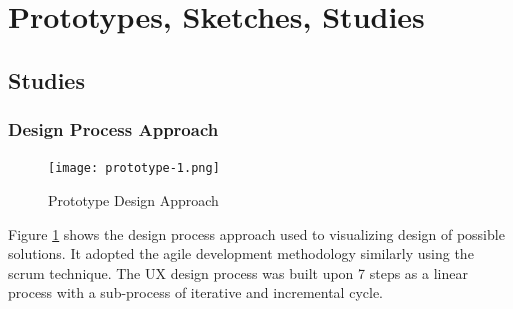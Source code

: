 \section{Prototypes, Sketches, Studies}

  \subsection{Studies}
  
    \subsubsection{Design Process Approach}
      \begin{figure}[H]
        \centering
        \texttt{[image: prototype-1.png]}
        \caption{Prototype Design Approach}
        \label{fig:design-approach}
      \end{figure}
      \par Figure \ref{fig:design-approach} shows the design process approach used to visualizing design of possible solutions. It adopted the agile development methodology similarly using the scrum technique. The UX design process was built upon 7 steps as a linear process with a sub-process of iterative and incremental cycle.
